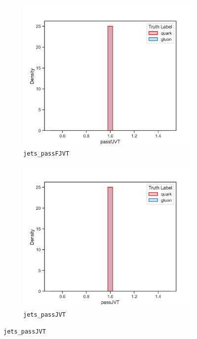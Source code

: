 \begin{figure}[!htb]
\begin{subfigure}[t]{0.49\textwidth}
	\end{subfigure}
	\begin{subfigure}[t]{0.49\textwidth}
		\includegraphics[width=1\textwidth]{src/plots/distributions/highlevel/jets_passFJVT.png}
		\caption{\texttt{jets\_passFJVT}}
		\label{fig:highlevel_26}
	\end{subfigure}
	\begin{subfigure}[t]{0.49\textwidth}
		\includegraphics[width=1\textwidth]{src/plots/distributions/highlevel/jets_passJVT.png}
		\caption{\texttt{jets\_passJVT}}
		\label{fig:highlevel_27}

\end{subfigure}
\end{figure}
